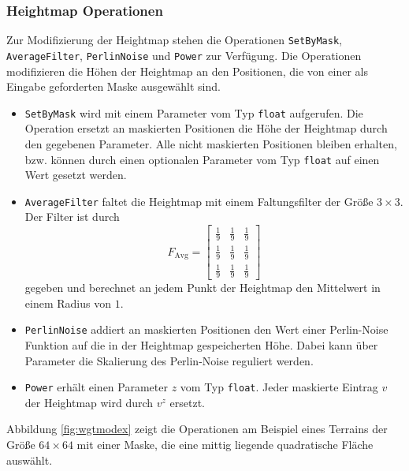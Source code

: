\subsubsection{Heightmap Operationen}
Zur Modifizierung der Heightmap stehen die Operationen \texttt{SetByMask}, \texttt{AverageFilter}, \texttt{PerlinNoise} und \texttt{Power} zur Verfügung. Die Operationen modifizieren die Höhen der Heightmap an den Positionen, die von einer als Eingabe geforderten Maske ausgewählt sind.
\begin{itemize}
    \item \texttt{SetByMask} wird mit einem Parameter vom Typ \texttt{float} aufgerufen. Die Operation ersetzt an maskierten Positionen die Höhe der Heightmap durch den gegebenen Parameter. Alle nicht maskierten Positionen bleiben erhalten, bzw. können durch einen optionalen Parameter vom Typ \texttt{float} auf einen Wert gesetzt werden.
    \item \texttt{AverageFilter} faltet die Heightmap mit einem Faltungsfilter der Größe $3\times 3$. Der Filter ist durch \begin{displaymath}
        F_{\text{Avg}}=\begin{bmatrix}
            \frac{1}{9}&\frac{1}{9}&\frac{1}{9}\\
            \frac{1}{9}&\frac{1}{9}&\frac{1}{9}\\
            \frac{1}{9}&\frac{1}{9}&\frac{1}{9}
        \end{bmatrix}
    \end{displaymath}
    gegeben und berechnet an jedem Punkt der Heightmap den Mittelwert in einem Radius von $1$.
    \item \texttt{PerlinNoise} addiert an maskierten Positionen den Wert einer Perlin-Noise Funktion auf die in der Heightmap gespeicherten Höhe. Dabei kann über Parameter die Skalierung des Perlin-Noise reguliert werden.
    \item \texttt{Power} erhält einen Parameter $z$ vom Typ \texttt{float}. Jeder maskierte Eintrag $v$ der Heightmap wird durch $v^z$ ersetzt.
\end{itemize}
Abbildung \ref{fig:wgtmodex} zeigt die Operationen am Beispiel eines Terrains der Größe $64\times 64$ mit einer Maske, die eine mittig liegende quadratische Fläche auswählt.


